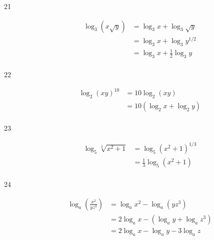 \documentclass{exam}
\begin{document}
\begin{description}
      \item[21] 
        \begin{align*}
          \log_3 \left( x \sqrt{y} \right) &= \log_3 x + \log_3 \sqrt{y} \\
                                           &= \log_3 x + \log_3 y^{1/2} \\
                                           &= \boxed{\log_3 x + \frac{1}{2} \log_3 y} \\
        \end{align*}

      \item[22] 
        \begin{align*}
          \log_2 (xy)^{10} &= 10 \log_2 (xy) \\
                           &= \boxed{10 (\log_2 x + \log_2 y)} \\
        \end{align*}

      \item[23] 
        \begin{align*}
          \log_5 \sqrt[3]{x^2 + 1} &= \log_5 \left( x^2 + 1 \right)^{1/3} \\
                                   &= \boxed{\frac{1}{3} \log_5 \left( x^2 + 1 \right)} \\
        \end{align*}

      \item[24] 
        \begin{align*}
          \log_a \left( \frac{x^2}{yz^3} \right) &= \log_a x^2 - \log_a \left( yz^3 \right) \\
                                                 &= 2 \log_a x - \left( \log_a y + \log_a z^3 \right) \\
                                                 &= \boxed{2 \log_a x - \log_a y - 3 \log_a z} \\
        \end{align*}



\end{description}
\end{document}
